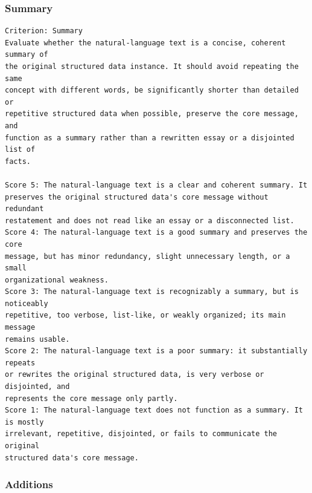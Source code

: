 \subsubsection{Summary}

\begin{lstlisting}
Criterion: Summary
Evaluate whether the natural-language text is a concise, coherent summary of
the original structured data instance. It should avoid repeating the same
concept with different words, be significantly shorter than detailed or
repetitive structured data when possible, preserve the core message, and
function as a summary rather than a rewritten essay or a disjointed list of
facts.

Score 5: The natural-language text is a clear and coherent summary. It
preserves the original structured data's core message without redundant
restatement and does not read like an essay or a disconnected list.
Score 4: The natural-language text is a good summary and preserves the core
message, but has minor redundancy, slight unnecessary length, or a small
organizational weakness.
Score 3: The natural-language text is recognizably a summary, but is noticeably
repetitive, too verbose, list-like, or weakly organized; its main message
remains usable.
Score 2: The natural-language text is a poor summary: it substantially repeats
or rewrites the original structured data, is very verbose or disjointed, and
represents the core message only partly.
Score 1: The natural-language text does not function as a summary. It is mostly
irrelevant, repetitive, disjointed, or fails to communicate the original
structured data's core message.
\end{lstlisting}

\subsubsection{Additions}

